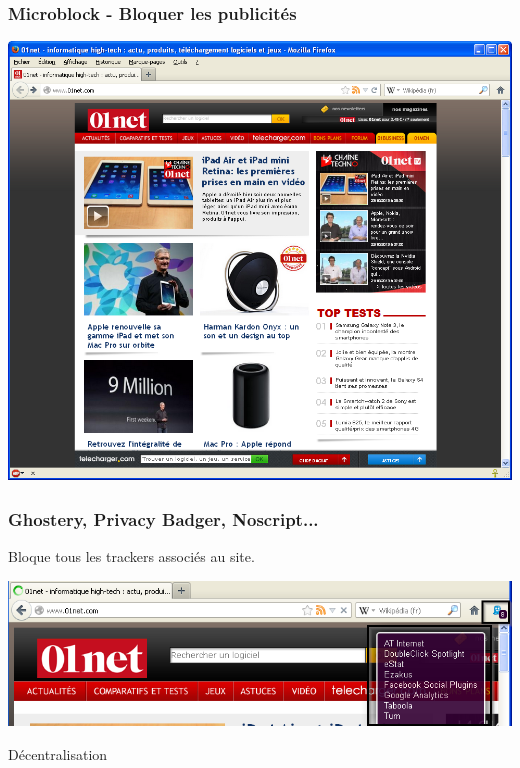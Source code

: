 \documentclass{beamer}
\begin{document}
\begin{frame}
\frametitle{Microblock - Bloquer les publicités}
\begin{center}
\includegraphics[scale=0.4] {./images/Adblock02.png}
\end{center}
\end{frame}

\begin{frame}
\frametitle{Ghostery, Privacy Badger, Noscript...}
Bloque tous les trackers associés au site.
\begin{center}
\includegraphics[scale=0.4] {./images/Ghostery_tracker.png}
\end{center}
\end{frame}

\begin{frame}
\begin{center}
\Huge {Décentralisation}
\end{center}
\end{frame}
\end{document}
